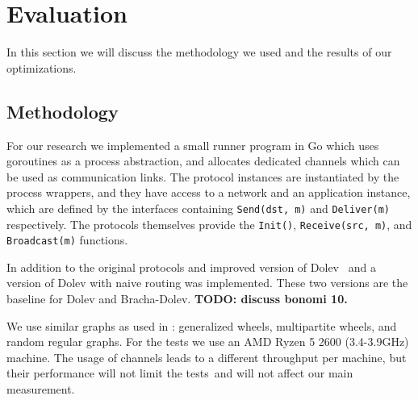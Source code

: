 \section{Evaluation}
\label{eval}



In this section we will discuss the methodology we used and the results of our optimizations.

\subsection{Methodology}
For our research we implemented a small runner program in Go which uses goroutines as a process abstraction, and allocates dedicated channels which can be used as communication links. The protocol instances are instantiated by the process wrappers, and they have access to a network and an application instance, which are defined by the interfaces containing \texttt{Send(dst, m)} and \texttt{Deliver(m)} respectively. The protocols themselves provide the \texttt{Init()}, \texttt{Receive(src, m)}, and \texttt{Broadcast(m)} functions.

In addition to the original protocols and improved version of Dolev~\cite{bonomi2019multihop} and a version of Dolev with naive routing was implemented. These two versions are the baseline for Dolev and Bracha-Dolev. 
\textbf{TODO: discuss bonomi 10.}

We use similar graphs as used in \cite{bonomi2019multihop,bonomi2021practical}: generalized wheels, multipartite wheels, and random regular graphs. For the tests we use an AMD Ryzen 5 2600 (3.4-3.9GHz) machine. The usage of channels leads to a different throughput per machine, but their performance will not limit the tests~\citationneeded and will not affect our main measurement.

